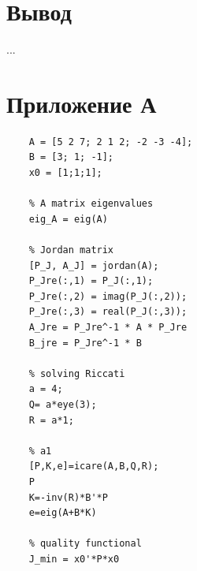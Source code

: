 \documentclass[a4paper, 12pt]{article}
\begin{document}
    \section{Вывод}
    ...


    \section{Приложение А}
    \begin{lstlisting}[label=task1, caption={Программа для задания 1}]
    % plant parameters
    A = [5 2 7; 2 1 2; -2 -3 -4];
    B = [3; 1; -1];
    x0 = [1;1;1];

    % A matrix eigenvalues
    eig_A = eig(A)

    % Jordan matrix
    [P_J, A_J] = jordan(A);
    P_Jre(:,1) = P_J(:,1);
    P_Jre(:,2) = imag(P_J(:,2));
    P_Jre(:,3) = real(P_J(:,3));
    A_Jre = P_Jre^-1 * A * P_Jre
    B_jre = P_Jre^-1 * B

    % solving Riccati
    a = 4;
    Q= a*eye(3);
    R = a*1;

    % a1
    [P,K,e]=icare(A,B,Q,R);
    P
    K=-inv(R)*B'*P
    e=eig(A+B*K)

    % quality functional
    J_min = x0'*P*x0
    \end{lstlisting}
\end{document}
